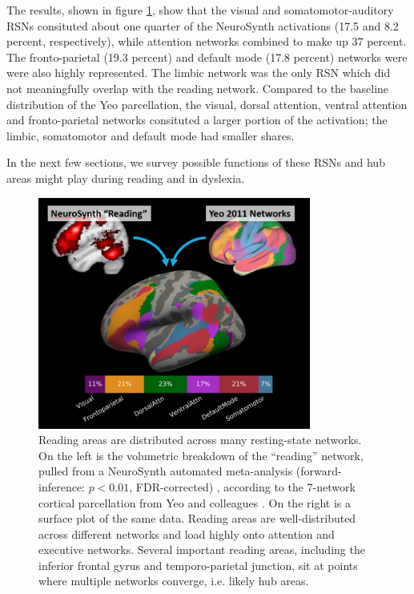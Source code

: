 The results, shown in figure \ref{fig:ch1-yeo-to-neurosynth}, show that the visual and somatomotor-auditory RSNs consituted about one quarter of the NeuroSynth activations (17.5 and 8.2 percent, respectively), while attention networks combined to make up 37 percent. The fronto-parietal (19.3 percent) and default mode (17.8 percent) networks were were also highly represented. The limbic network was the only RSN which did not meaningfully overlap with the reading network. Compared to the baseline distribution of the Yeo parcellation, the visual, dorsal attention, ventral attention and fronto-parietal networks consituted a larger portion of the activation; the limbic, somatomotor and default mode had smaller shares. 

In the next few sections, we survey possible functions of these RSNs and hub areas might play during reading and in dyslexia.  

\begin{figure}[t]
\centering
\includegraphics[height=3in]{images/ch1-yeo-to-neurosynth.png}
    \caption[Reading areas are distributed across many resting-state networks.]{Reading areas are distributed across many resting-state networks. On the left is the volumetric breakdown of the ``reading'' network, pulled from a NeuroSynth automated meta-analysis (forward-inference: $p < 0.01$, FDR-corrected) \citep{Yarkoni2011}, according to the 7-network cortical parcellation from Yeo and colleagues \citep{Yeo2011}. On the right is a surface plot of the same data. Reading areas are well-distributed across different networks and load highly onto attention and executive networks. Several important reading areas, including the inferior frontal gyrus and temporo-parietal junction, sit at points where multiple networks converge, i.e. likely hub areas.}
    \label{fig:ch1-yeo-to-neurosynth}
\end{figure}

